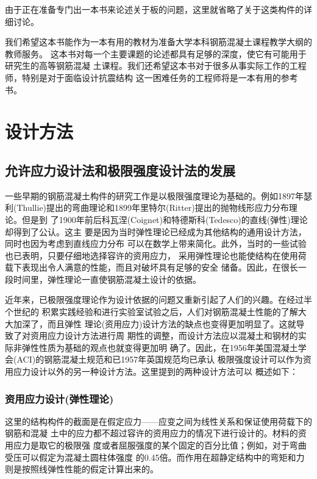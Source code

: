 \documentclass[12pt,a4paper]{book}
\begin{document}
由于正在准备专门出一本书来论述关于板的问题，这里就省略了关于这类构件的详细讨论。

我们希望这本书能作为一本有用的教材为准备大学本科钢筋混凝土课程教学大纲的教师服务。
这本书对每一个主要课题的论述都具有足够的深度，使它有可能用于研究生的高等钢筋混凝
土课程。我们还希望这本书对于很多从事实际工作的工程师，特别是对于面临设计抗震结构
这一困难任务的工程师将是一本有用的参考书。

\tableofcontents

\chapter{设计方法}

\section{允许应力设计法和极限强度设计法的发展}

一些早期的钢筋混凝土构件的研究工作是以极限强度理论为基础的。例如1897年瑟
利(Thullie)提出的弯曲理论和1899年里特尔(Ritter)提出的抛物线形应力分布理论。但是到
了1900年前后科瓦涅(Coignet)和特德斯科(Tedesco)的直线(弹性)理论却得到了公认。这主
要是因为当时弹性理论已经成为其他结构的通用设计方法，同时也因为考虑到直线应力分布
可以在数学上带来简化。此外，当时的一些试验也已表明，只要仔细地选择容许的资用应力，
采用弹性理论也能使结构在使用荷载下表现出令人满意的性能，而且对破坏具有足够的安全
储备。因此，在很长一段时间里，弹性理论一直使钢筋混凝土设计的依据。

近年来，已极限强度理论作为设计依据的问题又重新引起了人们的兴趣。在经过半个世纪的
积累实践经验和进行实验室试验之后，人们对钢筋混凝土性能的了解大大加深了，而且弹性
理论(资用应力)设计方法的缺点也变得更加明显了。这就导致了对资用应力设计方法进行周
期性的调整，而设计方法应以混凝土和钢材的实际非弹性性质为基础的观点也就变得更加明
确了。因此，在1956年美国混凝土学会(ACI)的钢筋混凝土规范和已1957年英国规范均已承认
极限强度设计可以作为资用应力设计以外的另一种设计方法。这里提到的两种设计方法可以
概述如下：

\subsection{资用应力设计(弹性理论)}

这里的结构构件的截面是在假定应力——应变之间为线性关系和保证使用荷载下的钢筋和混凝
土中的应力都不超过容许的资用应力的情况下进行设计的。材料的资用应力是取它的极限强
度或者屈服强度的某个固定的百分比值；例如，对于弯曲受压可以假定为混凝土圆柱体强度
的0.45倍。而作用在超静定结构中的弯矩和力则是按照线弹性性能的假定计算出来的。
\end{document}
